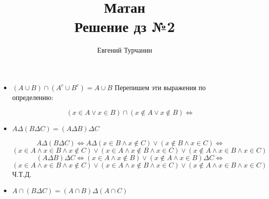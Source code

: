 \documentclass{report}
\title{\Huge{Матан}\\ Решение дз №2}
\author{\huge{Евгений Турчанин}}
\date{}
\begin{document}
\maketitle


\sol \begin{itemize}
  \item $(A \cup B) \cap\left(A^{c} \cup B^{c}\right)=A \cup B$
	Перепишем эти выражения по определению:
	\begin{center}
	\begin{equation}
		(x \in A \vee x \in B) \cap (x \notin A \vee x \notin B)\Leftrightarrow
	\end{equation}
	\end{center}
  \item $A \Delta(B \Delta C)=(A \Delta B) \Delta C$
	\begin{center}
	\begin{equation}
	A \Delta(B \Delta C) \Leftrightarrow A \Delta (x \in B \wedge x \notin C) \vee (x \notin B \wedge x \in C) \Leftrightarrow
	\end{equation}
	\begin{equation}
		(x \in A \wedge x \in B \wedge x \notin C) \vee (x \in A \wedge x \notin B \wedge x \in C) \vee (x \notin A \wedge x \in B \wedge x \in C)
	\end{equation}
	\begin{equation}
	(A \Delta B) \Delta C \Leftrightarrow (x \in A \wedge x \notin B) \vee (x \notin A \wedge x \in B) \Delta C \Leftrightarrow
	\end{equation}
	\begin{equation}
		(x \in A \wedge x \in B \wedge x \notin C) \vee (x \in A \wedge x \notin B \wedge x \in C) \vee (x \notin A \wedge x \in B \wedge x \in C)
	\end{equation}
	Ч.Т.Д.
	\end{center}
  \item $A \cap(B \Delta C)=(A \cap B) \Delta(A \cap C)$
	\begin{center}
	\begin{equation}

\end{equation}
\end{center}
\end{itemize}
\end{document}
